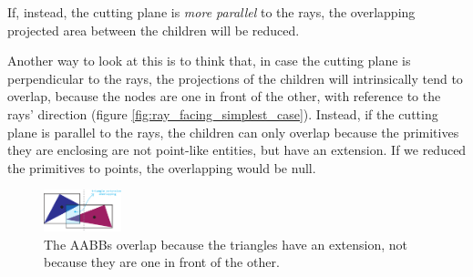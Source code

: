 \documentclass[acmtog, anonymous, review]{acmart}
\begin{document}
If, instead, the cutting plane is \textit{more parallel} to the rays, the overlapping projected area between the children will be reduced.


Another way to look at this is to think that, in case the cutting plane is perpendicular to the rays, the projections of the children will intrinsically tend to overlap, because the nodes are one in front of the other, with reference to the rays' direction (figure \ref{fig:ray_facing_simplest_case}). Instead, if the cutting plane is parallel to the rays, the children can only overlap because the primitives they are enclosing are not point-like entities, but have an extension. If we reduced the primitives to points, the overlapping would be null.

\begin{figure}[H]
  \centering
  \includegraphics[width=0.2\textwidth]{Images/overlapping_by_extension.png}
  \caption{The AABBs overlap because the triangles have an extension, not because they are one in front of the other.}
  \label{fig:overlapping_by_extension}
\end{figure}
\end{document}
